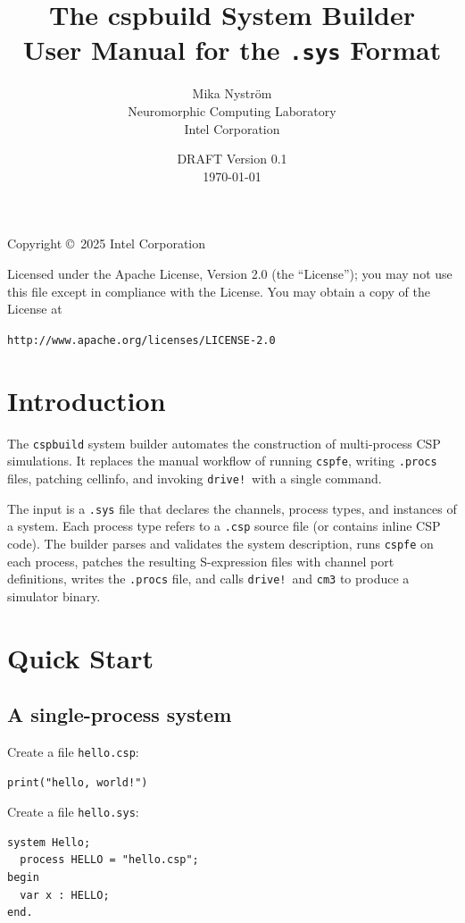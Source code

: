 \documentclass[11pt]{article}
\title{\textbf{The cspbuild System Builder} \\[0.5em]
\large User Manual for the \texttt{.sys} Format}
\author{Mika Nystr\"om \\
  Neuromorphic Computing Laboratory \\
  Intel Corporation}
\date{DRAFT Version 0.1\\
\today}
\begin{document}
\maketitle

\vspace{1em}

\noindent
 Copyright \copyright\ 2025 Intel Corporation

 Licensed under the Apache License, Version 2.0 (the ``License'');
 you may not use this file except in compliance with the License.
 You may obtain a copy of the License at

 {\tt http://www.apache.org/licenses/LICENSE-2.0}

\section{Introduction}

The \texttt{cspbuild} system builder automates the construction of
multi-process CSP simulations.  It replaces the manual workflow of
running \texttt{cspfe}, writing \texttt{.procs} files, patching
cellinfo, and invoking \texttt{drive!}\ with a single command.

The input is a \texttt{.sys} file that declares the channels, process
types, and instances of a system.  Each process type refers to a
\texttt{.csp} source file (or contains inline CSP code).  The builder
parses and validates the system description, runs \texttt{cspfe} on
each process, patches the resulting S-expression files with channel
port definitions, writes the \texttt{.procs} file, and calls
\texttt{drive!}\ and \texttt{cm3} to produce a simulator binary.

\section{Quick Start}

\subsection{A single-process system}

Create a file \texttt{hello.csp}:
\begin{Verbatim}[samepage=true]
print("hello, world!")
\end{Verbatim}

Create a file \texttt{hello.sys}:
\begin{Verbatim}[samepage=true]
system Hello;
  process HELLO = "hello.csp";
begin
  var x : HELLO;
end.
\end{Verbatim}
\end{document}
